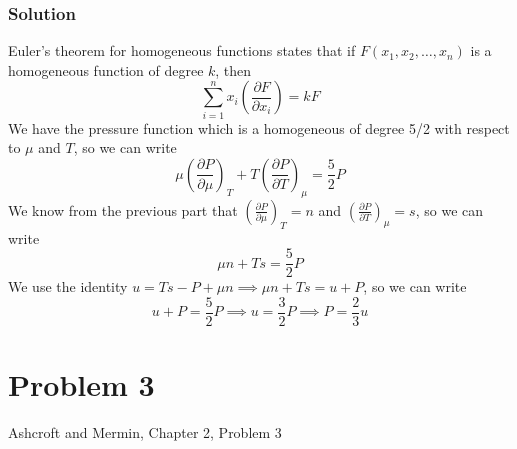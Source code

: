 \documentclass[12pt]{article}
\begin{document}
\subsubsection{Solution}
Euler's theorem for homogeneous functions states that if $F(x_1, x_2, \ldots, x_n)$ is a homogeneous function of degree $k$, then
\begin{equation}
    \sum_{i=1}^{n} x_i \left( \frac{\partial F}{\partial x_i} \right) = kF
\end{equation}
We have the pressure function which is a homogeneous of degree 5/2 with respect to $\mu$ and $T$, so we can write
\begin{equation}
    \mu \left( \frac{\partial P}{\partial \mu} \right)_T + T \left( \frac{\partial P}{\partial T} \right)_\mu = \frac{5}{2} P
\end{equation}
We know from the previous part that $\left( \frac{\partial P}{\partial \mu} \right)_T = n$ and $\left( \frac{\partial P}{\partial T} \right)_\mu = s$, so we can write
\begin{equation}
    \mu n + Ts = \frac{5}{2} P
\end{equation}
We use the identity $u = Ts - P + \mu n \implies \mu n + Ts = u + P$, so we can write
\begin{equation}
    u + P = \frac{5}{2} P \implies u = \frac{3}{2} P \implies P = \frac{2}{3} u
\end{equation}


\section{Problem 3}
Ashcroft and Mermin, Chapter 2, Problem 3
\end{document}
